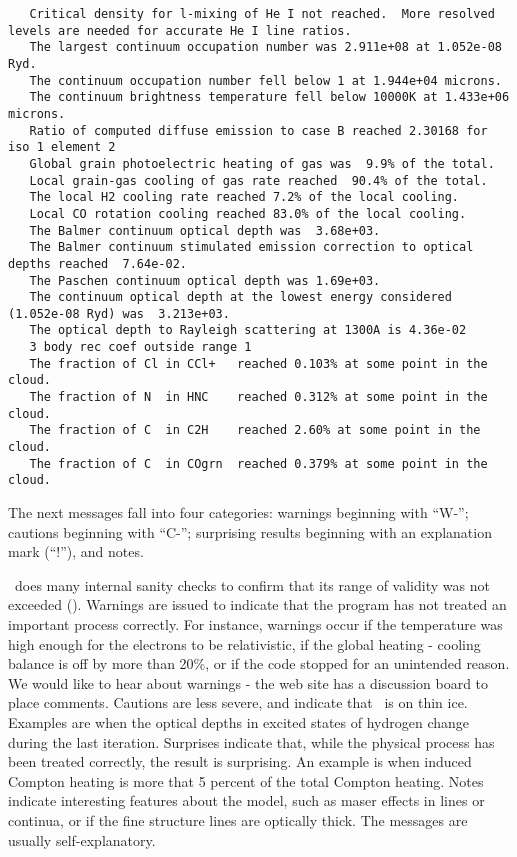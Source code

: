 {\begin{verbatim}
   Critical density for l-mixing of He I not reached.  More resolved levels are needed for accurate He I line ratios.
   The largest continuum occupation number was 2.911e+08 at 1.052e-08 Ryd.
   The continuum occupation number fell below 1 at 1.944e+04 microns.
   The continuum brightness temperature fell below 10000K at 1.433e+06 microns.
   Ratio of computed diffuse emission to case B reached 2.30168 for iso 1 element 2
   Global grain photoelectric heating of gas was  9.9% of the total.
   Local grain-gas cooling of gas rate reached  90.4% of the total.
   The local H2 cooling rate reached 7.2% of the local cooling.
   Local CO rotation cooling reached 83.0% of the local cooling.
   The Balmer continuum optical depth was  3.68e+03.
   The Balmer continuum stimulated emission correction to optical depths reached  7.64e-02.
   The Paschen continuum optical depth was 1.69e+03.
   The continuum optical depth at the lowest energy considered (1.052e-08 Ryd) was  3.213e+03.
   The optical depth to Rayleigh scattering at 1300A is 4.36e-02
   3 body rec coef outside range 1
   The fraction of Cl in CCl+   reached 0.103% at some point in the cloud.
   The fraction of N  in HNC    reached 0.312% at some point in the cloud.
   The fraction of C  in C2H    reached 2.60% at some point in the cloud.
   The fraction of C  in COgrn  reached 0.379% at some point in the cloud.
\end{verbatim}
}

The next messages fall into four categories: warnings beginning with
``W-''; cautions beginning with ``C-''; surprising results beginning with an
explanation mark (``!''), and notes.

\Cloudy\ does many internal sanity checks to confirm that its range of
validity was not exceeded (\citealp{Ferland2001b}).
Warnings are issued to indicate
that the program has not treated an important process correctly.
For
instance, warnings occur if the temperature was high enough for the electrons
to be relativistic, if the global heating - cooling balance is off by more
than 20\%, or if the code stopped for an unintended reason.
We would like
to hear about warnings - the web site has a discussion board to place
comments.
Cautions are less severe, and indicate that \Cloudy\ is on thin
ice.
Examples are when the optical depths in excited states of hydrogen
change during the last iteration.
Surprises indicate
that, while the physical process has been treated correctly, the result
is surprising.
An example is when induced Compton heating is more that
5 percent of the total Compton heating.
Notes indicate interesting features
about the model, such as maser effects in lines or continua, or if the fine
structure lines are optically thick.
The messages are usually
self-explanatory.

